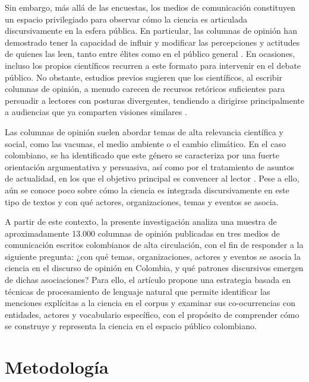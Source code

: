 \documentclass[11pt,a4paper]{article}
\begin{document}
	Sin embargo, más allá de las encuestas, los medios de comunicación constituyen un espacio privilegiado para observar cómo la ciencia es articulada discursivamente en la esfera pública. En particular, las columnas de opinión han demostrado tener la capacidad de influir y modificar las percepciones y actitudes de quienes las leen, tanto entre élites como en el público general \cite{Coppock2018}. En ocasiones, incluso los propios científicos recurren a este formato para intervenir en el debate público. No obstante, estudios previos sugieren que los científicos, al escribir columnas de opinión, a menudo carecen de recursos retóricos suficientes para persuadir a lectores con posturas divergentes, tendiendo a dirigirse principalmente a audiencias que ya comparten visiones similares \cite{Syfert2025}.
	
	Las columnas de opinión suelen abordar temas de alta relevancia científica y social, como las vacunas, el medio ambiente o el cambio climático. En el caso colombiano, se ha identificado que este género se caracteriza por una fuerte orientación argumentativa y persuasiva, así como por el tratamiento de asuntos de actualidad, en los que el objetivo principal es convencer al lector \cite{CaroLopera2020}. Pese a ello, aún se conoce poco sobre cómo la ciencia es integrada discursivamente en este tipo de textos y con qué actores, organizaciones, temas y eventos se asocia.
	

	A partir de este contexto, la presente investigación analiza una muestra de aproximadamente 13.000 columnas de opinión publicadas en tres medios de comunicación escritos colombianos de alta circulación, con el fin de responder a la siguiente pregunta: ¿con qué temas, organizaciones, actores y eventos se asocia la ciencia en el discurso de opinión en Colombia, y qué patrones discursivos emergen de dichas asociaciones? Para ello, el artículo propone una estrategia basada en técnicas de procesamiento de lenguaje natural que permite identificar las menciones explícitas a la ciencia en el corpus y examinar sus co-ocurrencias con entidades, actores y vocabulario específico, con el propósito de comprender cómo se construye y representa la ciencia en el espacio público colombiano.
	
	\section{Metodología}
	
\end{document}
